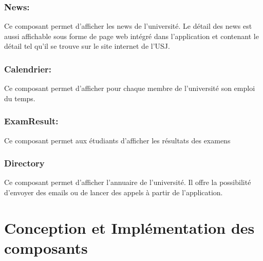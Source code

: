		\subsubsection*{News:}
		Ce composant permet d'afficher les news de l'université. Le détail des news est aussi affichable sous forme de page web intégré dans l'application et contenant le détail tel qu'il se trouve sur le site internet de l'USJ. 
		\subsubsection*{Calendrier:}
		Ce composant permet d'afficher pour chaque membre de l'université son emploi du temps. 
		\subsubsection*{ExamResult:}
		Ce composant permet aux étudiants d'afficher les résultats des examens
		\subsubsection*{Directory}
		Ce composant permet d'afficher l'annuaire de l'université. Il offre la possibilité d'envoyer des emails ou de lancer des appels à partir de l'application.




\section{Conception et Implémentation des composants}
